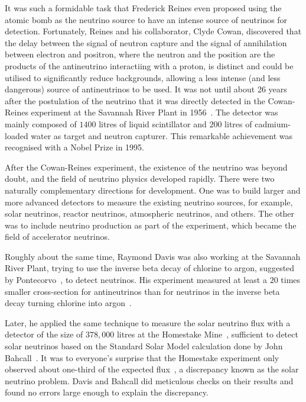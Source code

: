 It was such a formidable task that Frederick Reines even proposed using the atomic bomb as the neutrino source to have an intense source of neutrinos for detection.
Fortunately, Reines and his collaborator, Clyde Cowan, discovered that the delay between the signal of neutron capture and the signal of annihilation between electron and positron, where the neutron and the position are the products of the antineutrino interactiing with a proton, is distinct and could be utilised to significantly reduce backgrounds, allowing a less intense (and less dangerous) source of antineutrinos to be used.
It was not until about 26 years after the postulation of the neutrino that it was directly detected in the Cowan-Reines experiment at the Savannah River Plant in 1956~\cite{Cowan:1956rrn}. 
The detector was mainly composed of $1400$ litres of liquid scintillator and $200$ litres of cadmium-loaded water as target and neutron capturer.
This remarkable achievement was recognised with a Nobel Prize in 1995.

After the Cowan-Reines experiment, the existence of the neutrino was beyond doubt, and the field of neutrino physics developed rapidly. 
There were two naturally complementary directions for development.
One was to build larger and more advanced detectors to measure the existing neutrino sources, for example, solar neutrinos, reactor neutrinos, atmospheric neutrinos, and others.
The other was to include neutrino production as part of the experiment, which became the field of accelerator neutrinos.

Roughly about the same time, Raymond Davis was also working at the Savannah River Plant, trying to use the inverse beta decay of chlorine to argon, suggested by Pontecorvo~\cite{Pontecorvo:1946mv}, to detect neutrinos.
His experiment measured at least a $20$ times smaller cross-section for antineutrinos than for neutrinos in the inverse beta decay turning chlorine into argon~\cite{Davis:1959pba}.

Later, he applied the same technique to measure the solar neutrino flux with a detector of the size of $378,000$ litres at the Homestake Mine~\cite{Davis:1964zz}, sufficient to detect solar neutrinos based on the Standard Solar Model calculation done by John Bahcall~\cite{Bahcall:1964ya}.
It was to everyone's surprise that the Homestake experiment only observed about one-third of the expected flux~\cite{Davis:1968cp}, a discrepancy known as the solar neutrino problem.
Davis and Bahcall did meticulous checks on their results and found no errors large enough to explain the discrepancy.

